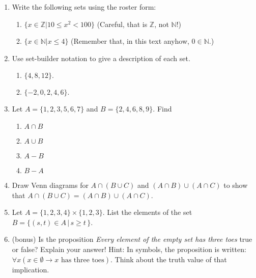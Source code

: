 \documentclass[11pt]{amsart}
\begin{document}
\begin{enumerate}


\item Write the following sets using the roster form:

\begin{enumerate}
\item $\{x \in \mathbb{Z} | 10\leq x^2< 100\}$ (Careful, that is $\mathbb Z$, not $\mathbb N$!)
\item  $\{x\in \mathbb{N} | x\leq 4\}$ (Remember that, in this text anyhow, $0\in \mathbb{N}$.)\\[3pt]
\end{enumerate}

\item Use set-builder notation to give a description of each set.
\begin{enumerate}
\item $\{ 4, 8, 12\}.$
\item $\{-2, 0, 2, 4, 6\}.$\\[3pt]
\end{enumerate}

\item  Let $A=\{1,2,3,5,6,7\}$ and $B=\{2,4,6,8,9\}$. Find 
\begin{enumerate}
\item $A\cap B$
\item $A\cup B$
\item $A-B$
\item $B-A$\\[3pt]
\end{enumerate}

\item Draw Venn diagrams for $A\cap (B \cup C)$ and $(A\cap B)\cup(A\cap C)$ to  show that $A\cap (B \cup C) = (A\cap B)\cup(A\cap C)$.\\[3pt]


\item Let $A=\{1,2,3,4\}\times\{1,2,3\}$. List the elements of the set
$B= \{ (s,t)\in A\,|\, s\geq t\,\}$.\\[3pt] 

\item (bonus) Is the proposition {\it Every element of the empty set has 
three toes} true or false? Explain your answer! Hint: In symbols, the proposition is written:
  $\forall x (x\in \emptyset \longrightarrow x \text{ has three toes})$. Think about the truth value of that implication.

\end{enumerate}
\end{document}
